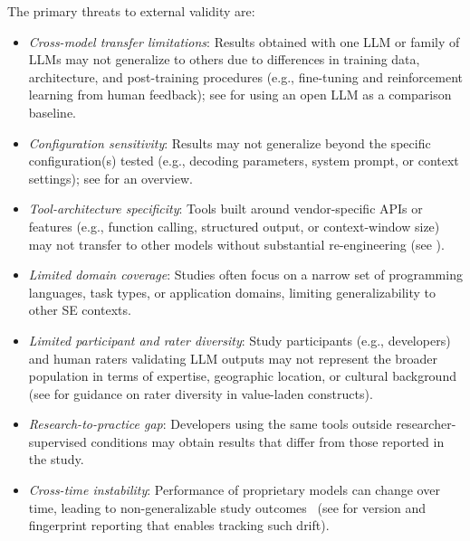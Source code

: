 The primary threats to external validity are:
\begin{itemize}
    \item \emph{Cross-model transfer limitations}: Results obtained with one LLM or family of LLMs may not generalize to others due to differences in training data, architecture, and post-training procedures (e.g., fine-tuning and reinforcement learning from human feedback); see \openllm for using an open LLM as a comparison baseline.
    \item \emph{Configuration sensitivity}: Results may not generalize beyond the specific configuration(s) tested (e.g., decoding parameters, system prompt, or context settings); see \design for an overview.
    \item \emph{Tool-architecture specificity}: Tools built around vendor-specific APIs or features (e.g., function calling, structured output, or context-window size) may not transfer to other models without substantial re-engineering (see \design).
    \item \emph{Limited domain coverage}: Studies often focus on a narrow set of programming languages, task types, or application domains, limiting generalizability to other SE contexts.
    \item \emph{Limited participant and rater diversity}: Study participants (e.g., developers) and human raters validating LLM outputs may not represent the broader population in terms of expertise, geographic location, or cultural background (see \humanvalidation for guidance on rater diversity in value-laden constructs).
    \item \emph{Research-to-practice gap}: Developers using the same tools outside researcher-supervised conditions may obtain results that differ from those reported in the study.
    \item \emph{Cross-time instability}: Performance of proprietary models can change over time, leading to non-generalizable study outcomes~\cite{DBLP:journals/corr/abs-2307-09009, doi:10.1148/radiol.232411} (see \modelversion for version and fingerprint reporting that enables tracking such drift).
\end{itemize}

